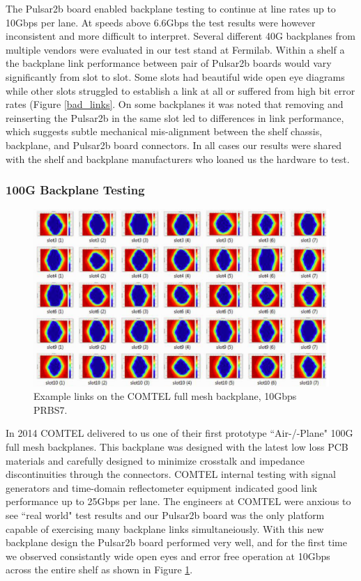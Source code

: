 \documentclass[letterpaper]{article}
\begin{document}
The Pulsar2b board enabled backplane testing to continue at line rates up to 10Gbps per lane.  At speeds above 6.6Gbps the test results were however inconsistent and more difficult to interpret.  Several different 40G backplanes from multiple vendors were evaluated in our test stand at Fermilab.  Within a shelf a the backplane link performance between pair of Pulsar2b boards would vary significantly from slot to slot.  Some slots had beautiful wide open eye diagrams while other slots struggled to establish a link at all or suffered from high bit error rates (Figure \ref{bad_links}.  On some backplanes it was noted that removing and reinserting the Pulsar2b in the same slot led to differences in link performance, which suggests subtle mechanical mis-alignment between the shelf chassis, backplane, and Pulsar2b board connectors.  In all cases our results were shared with the shelf and backplane manufacturers who loaned us the hardware to test.

\subsubsection{100G Backplane Testing}
\label{link_perf_100g}

\begin{figure}
\centering
\includegraphics[width=12cm]{comtel_results.png}
\caption{Example links on the COMTEL full mesh backplane, 10Gbps PRBS7.}
\label{comtel_results}
\end{figure}

In 2014 COMTEL delivered to us one of their first prototype ``Air-/-Plane" 100G full mesh backplanes\cite{comtel}.  This backplane was designed with the latest low loss PCB materials and carefully designed to minimize crosstalk and impedance discontinuities through the connectors.  COMTEL internal testing with signal generators and time-domain reflectometer equipment indicated good link performance up to 25Gbps per lane. The engineers at COMTEL were anxious to see ``real world" test results and our Pulsar2b board was the only platform capable of exercising many backplane links simultaneiously.  With this new backplane design the Pulsar2b board performed very well, and for the first time we observed consistantly wide open eyes and error free operation at 10Gbps across the entire shelf as shown in Figure \ref{comtel_results}.  
\end{document}
